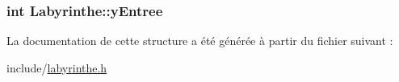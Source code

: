 \hypertarget{structLabyrinthe_ad004da5f699104c8df81a4a88fc8e53a}{
\subsubsection[{y\-Entree}]{\setlength{\rightskip}{0pt plus 5cm}int Labyrinthe\-::y\-Entree}}\label{structLabyrinthe_ad004da5f699104c8df81a4a88fc8e53a}


La documentation de cette structure a été générée à partir du fichier suivant \-:\begin{DoxyCompactItemize}
\item 
include/\hyperlink{labyrinthe_8h}{labyrinthe.\-h}\end{DoxyCompactItemize}
